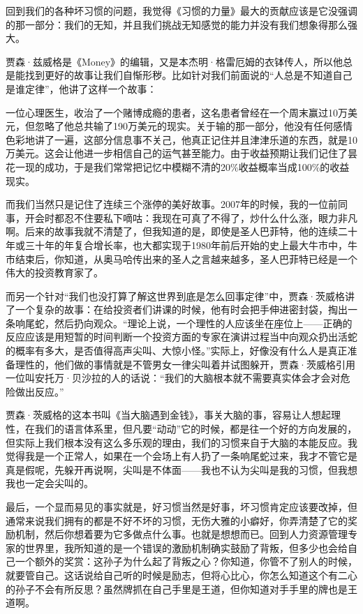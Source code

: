 回到我们的各种坏习惯的问题，我觉得《习惯的力量》最大的贡献应该是它没强调的那一部分：我们的无知，并且我们挑战无知感觉的能力并没有我们想象得那么强大。

贾森·兹威格是《Money》的编辑，又是本杰明·格雷厄姆的衣钵传人，所以他总是能找到更好的故事让我们自惭形秽。比如针对我们前面说的``人总是不知道自己是谁定律''，他讲了这样一个故事：

一位心理医生，收治了一个赌博成瘾的患者，这名患者曾经在一个周末赢过10万美元，但忽略了他总共输了190万美元的现实。关于输的那一部分，他没有任何感情色彩地讲了一遍，这部分信息事不关己，他真正记住并且津津乐道的东西，就是10万美元。这会让他进一步相信自己的运气甚至能力。由于收益预期让我们记住了昙花一现的成功，于是我们常常把记忆中模糊不清的20\%收益概率当成100\%的收益现实。

而我们当然只是记住了连续三个涨停的美好故事。2007年的时候，我的一位前同事，开会时都忍不住要私下嘀咕：我现在可真了不得了，炒什么什么涨，眼力非凡啊。后来的故事我就不清楚了，但我知道的是，即使是圣人巴菲特，他的连续二十年或三十年的年复合增长率，也大都实现于1980年前后开始的史上最大牛市中，牛市结束后，你知道，从奥马哈传出来的圣人之言越来越多，圣人巴菲特已经是一个伟大的投资教育家了。

而另一个针对``我们也没打算了解这世界到底是怎么回事定律''中，贾森·茨威格讲了一个复杂的故事：在给投资者们讲课的时候，他有时会把手伸进密封袋，掏出一条响尾蛇，然后扔向观众。``理论上说，一个理性的人应该坐在座位上------正确的反应应该是用短暂的时间判断一个投资方面的专家在演讲过程当中向观众扔出活蛇的概率有多大，是否值得高声尖叫、大惊小怪。''实际上，好像没有什么人是真正准备理性的，他们做的事情就是不管男女一律尖叫着并试图躲开，贾森·茨威格引用一位叫安托万·贝沙拉的人的话说：``我们的大脑根本就不需要真实体会才会对危险做出反应。''

贾森·茨威格的这本书叫《当大脑遇到金钱》，事关大脑的事，容易让人想起理性，在我们的语言体系里，但凡要``动动''它的时候，都是往一个好的方向发展的，但实际上我们根本没有这么多乐观的理由，我们的习惯来自于大脑的本能反应。我觉得我是一个正常人，如果在一个会场上有人扔了一条响尾蛇过来，我才不管它是真是假呢，先躲开再说啊，尖叫是不体面------我也不认为尖叫是我的习惯，但我想我也一定会尖叫的。

最后，一个显而易见的事实就是，好习惯当然是好事，坏习惯肯定应该要改掉，但通常来说我们拥有的都是不好不坏的习惯，无伤大雅的小癖好，你弄清楚了它的奖励机制，然后你想着要为它多做点什么事。也就是想想而已。回到人力资源管理专家的世界里，我所知道的是一个错误的激励机制确实鼓励了背叛，但多少也会给自己一个额外的奖赏：这孙子为什么起了背叛之心？你知道，你管不了别人的时候，就要管自己。这话说给自己听的时候是励志，但将心比心，你怎么知道这个有二心的孙子不会有所反思？虽然牌抓在自己手里是王道，但你知道对手手里的牌也是王道啊。

